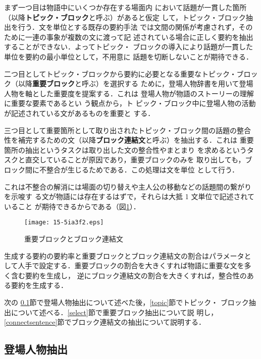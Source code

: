 \documentclass[japanese]{jnlp_1.4}
\begin{document}
 まず一つ目は物語中にいくつか存在する場面内
 において話題が一貫した箇所（以降{\bf トピック・ブロック}と呼ぶ）があると仮定
 して，トピック・ブロック抽出を行う．文を単位とする既存の要約手法
 では文間の関係が考慮されず，そのために一連の事象が複数の文に渡って記
 述されている場合に正しく要約を抽出することができない．よってトピック・
 ブロックの導入により話題が一貫した単位を要約の最小単位として，不用意に
 話題を切断しないことが期待できる．

 二つ目としてトピック・ブロックから要約に必要となる重要なトピック・ブロッ
 ク（以降{\bf 重要ブロック}と呼ぶ）を選択する
 ために，登場人物辞書を用いて登場人物を軸とした重要度を提案する．これは
 登場人物が物語のストーリーの理解に重要な要素である\cite{brian1981}とい
 う観点から，ト
 ピック・ブロック中に登場人物の活動が記述されている文があるものを重要と
 する．
 
 三つ目として重要箇所として取り出されたトピック・ブロック間の話題の整合
 性を補完するための文（以降{\bf ブロック連結文}と呼ぶ）を抽出する．これは
 重要箇所の抽出というタスクは取り出した文の整合性やまとまり
 を求めるというタスクと直交していることが原因であり，重要ブロックのみを
 取り出しても，ブロック間に不整合が生じるためである．この処理は文を単位
 として行う．
 
 これは不整合の解消には場面の切り替えや主人公の移動などの話題間の繋がり
 を示唆す
 る文が物語には存在するはずで，それらは大抵 1 文単位で記述されていること
 が期待できるからである（図\ref{segments}）．

\begin{figure}[b]
  \begin{center}
   \texttt{[image: 15-5ia3f2.eps]}
  \end{center}
  \caption{重要ブロックとブロック連結文}
  \label{segments}
 \end{figure}

 生成する要約の要約率と重要ブロックとブロック連結文の割合はパラメータと
 して人手で設定する．重要ブロックの割合を大きくすれば物語に重要な文を多
 く含む要約を生成し，
 逆にブロック連結文の割合を大きくすれば，整合性のある要約を生成する．

 次の
 \ref{extract}節で登場人物抽出について述べた後，\ref{topic}節でトピック・
 ブロック抽出について述べる．\ref{select}節で重要ブロック抽出について説
 明し，\ref{connectsentence}節でブロック連結文の抽出について説明する．



  \subsection{登場人物抽出}\label{extract}
\end{document}
